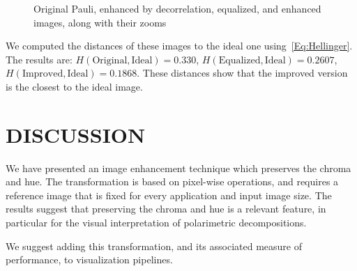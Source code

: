 \documentclass{article}
\begin{document}
\begin{figure}[hbt]
\caption{Original Pauli, enhanced by decorrelation, equalized, and enhanced images, along with their zooms}\label{Fig:Images}
\end{figure}

We computed the distances of these images to the ideal one using~\eqref{Eq:Hellinger}.
The results are:
$H(\text{Original}, \text{Ideal})=0.330$,
$H(\text{Equalized}, \text{Ideal})=0.2607$,
$H(\text{Improved}, \text{Ideal})=0.1868$.
These distances show that the improved version is the closest to the ideal image.

\section{DISCUSSION}
\label{sec:typestyle}
We have presented an image enhancement technique which preserves the chroma and hue.
The transformation is based on pixel-wise operations, and requires a reference image that is fixed for every application and input image size.
The results suggest that preserving the chroma and hue is a relevant feature, in particular for the visual interpretation of polarimetric decompositions.

We suggest adding this transformation, and its associated measure of performance, to visualization pipelines.



\end{document}
